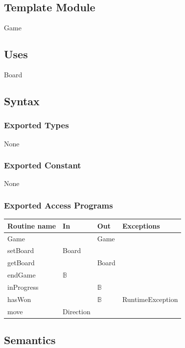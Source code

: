 \documentclass[12pt]{article}
\begin{document}
\subsection* {Template Module}

Game

\subsection* {Uses}

Board

\subsection* {Syntax}

\subsubsection* {Exported Types}

None

\subsubsection* {Exported Constant}

None

\subsubsection* {Exported Access Programs}

\begin{tabular}{| l | l | l | l |}
\hline
\textbf{Routine name} & \textbf{In} & \textbf{Out} & \textbf{Exceptions}\\
\hline
Game & ~ & Game & \\
\hline
setBoard & Board & ~ & \\
\hline
getBoard & ~ & Board & \\
\hline
endGame & $\mathbb{B}$ & ~ & \\
\hline
inProgress & ~ & $\mathbb{B}$ & \\
\hline
hasWon & ~ & $\mathbb{B}$ & RuntimeException \\
\hline
move & Direction & ~ & \\
\hline
\end{tabular}

\subsection* {Semantics}
\end{document}
